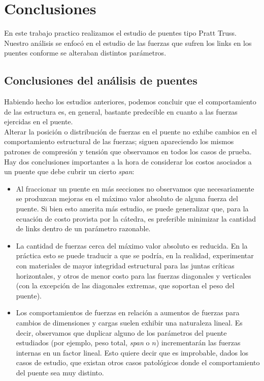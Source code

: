 \section{Conclusiones}

En este trabajo practico realizamos el estudio de puentes tipo Pratt Truss. Nuestro análisis se enfocó en el estudio de las fuerzas que sufren los links en los puentes conforme se alteraban distintos parámetros.\\

\subsection{Conclusiones del análisis de puentes}

Habiendo hecho los estudios anteriores, podemos concluir que el comportamiento de las estructura es, en general, bastante predecible en cuanto a las fuerzas ejercidas en el puente.\\

Alterar la posición o distribución de fuerzas en el puente no exhibe cambios en el comportamiento estructural de las fuerzas; siguen apareciendo los mismos patrones de compresión y tensión que observamos en todos los casos de prueba.\\

Hay dos conclusiones importantes a la hora de considerar los costos asociados a un puente que debe cubrir un cierto \textit{span}:

\begin{itemize}
\item Al fraccionar un puente en más secciones no observamos que necesariamente se produzcan mejoras en el máximo valor absoluto de alguna fuerza del puente. Si bien esto amerita más estudio, se puede generalizar que, para la ecuación de costo provista por la cátedra, es preferible minimizar la cantidad de links dentro de un parámetro razonable.
\item La cantidad de fuerzas cerca del máximo valor absoluto es reducida. En la práctica esto se puede traducir a que se podría, en la realidad, experimentar con materiales de mayor integridad estructural para las juntas críticas horizontales, y otros de menor costo para las fuerzas diagonales y verticales (con la excepción de las diagonales extremas, que soportan el peso del puente).
\item Los comportamientos de fuerzas en relación a aumentos de fuerzas para cambios de dimensiones y cargas suelen exhibir una naturaleza lineal. Es decir, observamos que duplicar alguno de los parámetros del puente estudiados (por ejemplo, peso total, \textit{span} o $n$) incrementarán las fuerzas internas en un factor lineal. Esto quiere decir que es improbable, dados los casos de estudio, que existan otros casos patológicos donde el comportamiento del puente sea muy distinto.
\end{itemize}

